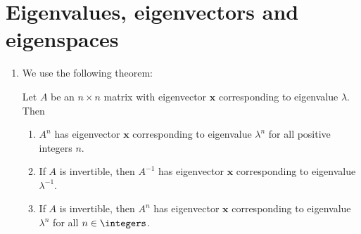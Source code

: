 \documentclass[english,12pt,a4paper]{scrartcl}
\renewcommand{\vec}[1]{\bm{#1}}
\begin{document}
\section*{Eigenvalues, eigenvectors and eigenspaces}
\begin{enumerate}[start=6]
  \item %
    We use the following theorem:
    \begin{theorem}
      Let $A$ be an $n \times n$ matrix with eigenvector $\vec{x}$ 
      corresponding to eigenvalue $\lambda$. Then
      \begin{enumerate}
        \item $A^n$ has eigenvector $\vec{x}$ corresponding to eigenvalue 
          $\lambda^n$ for all positive integers $n$.
        \item If $A$ is invertible, then $A^{-1}$ has eigenvector $\vec{x}$ 
          corresponding to eigenvalue $\lambda^{-1}$.
        \item If $A$ is invertible, then $A^{n}$ has eigenvector $\vec{x}$ 
          corresponding to eigenvalue $\lambda^n$ for all $n \in \integers$.
      \end{enumerate}
    \end{theorem}
    

\end{enumerate}
\end{document}
